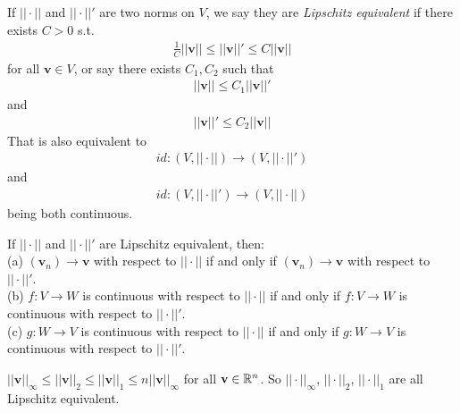 \documentclass[a4paper]{article}
\begin{document}
\begin{defi}
If $||\cdot||$ and $||\cdot||'$ are two norms on $V$, we say they are \emph{Lipschitz equivalent} if there exists $C>0$ s.t.
\begin{equation*}
\begin{aligned}
\frac{1}{C}||\mathbf{v}|| \leq ||\mathbf{v}||' \leq C||\mathbf{v}||
\end{aligned}
\end{equation*}
for all $\mathbf{v} \in V$, or say there exists $C_1,C_2$ such that
\begin{equation*}
\begin{aligned}
||\mathbf{v}|| \leq C_1 ||\mathbf{v}||'
\end{aligned}
\end{equation*}
and
\begin{equation*}
\begin{aligned}
||\mathbf{v}||' \leq C_2 ||\mathbf{v}||
\end{aligned}
\end{equation*}
That is also equivalent to
\begin{equation*}
\begin{aligned}
id:\left(V,||\cdot||\right) \to \left(V,||\cdot||'\right)
\end{aligned}
\end{equation*}
and
\begin{equation*}
\begin{aligned}
id:\left(V,||\cdot||'\right) \to \left(V,||\cdot||\right)
\end{aligned}
\end{equation*}
being both continuous.
\end{defi}

\begin{coro}
If $||\cdot||$ and $||\cdot||'$ are Lipschitz equivalent, then:\\
(a) $\left(\mathbf{v}_n\right) \to \mathbf{v}$ with respect to $||\cdot||$ if and only if $\left(\mathbf{v}_n\right) \to \mathbf{v}$ with respect to $||\cdot||'$.\\
(b) $f:V \to W$ is continuous with respect to $||\cdot||$ if and only if $f:V \to W$ is continuous with respect to $||\cdot||'$.\\
(c) $g:W \to V$ is continuous with respect to $||\cdot||$ if and only if $g:W \to V$ is continuous with respect to $||\cdot||'$.
\end{coro}

\begin{eg}
$||\mathbf{v}||_\infty \leq ||\mathbf{v}||_2 \leq ||\mathbf{v}||_1 \leq n||\mathbf{v}||_\infty$ for all $\mathbf{v} \in \mathbb{R}^n$. So $||\cdot||_\infty$, $||\cdot||_2$, $||\cdot||_1$ are all Lipschitz equivalent.
\end{eg}
\end{document}

